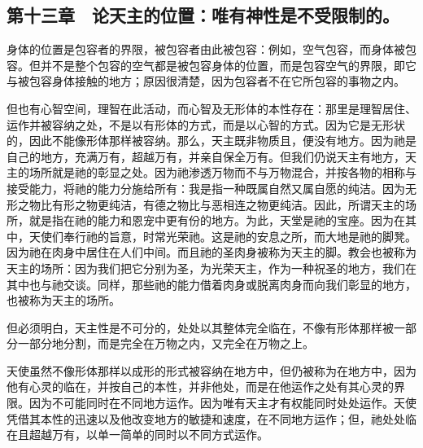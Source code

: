 
\subsection{第十三章　论天主的位置：唯有神性是不受限制的。}

身体的位置是包容者的界限，被包容者由此被包容：例如，空气包容，而身体被包容。但并不是整个包容的空气都是被包容身体的位置，而是包容空气的界限，即它与被包容身体接触的地方；原因很清楚，因为包容者不在它所包容的事物之内。\par

但也有心智空间，理智在此活动，而心智及无形体的本性存在：那里是理智居住、运作并被容纳之处，不是以有形体的方式，而是以心智的方式。因为它是无形状的，因此不能像形体那样被容纳。那么，天主既非物质且，便没有地方。因为祂是自己的地方，充满万有，超越万有，并亲自保全万有。但我们仍说天主有地方，天主的场所就是祂的彰显之处。因为祂渗透万物而不与万物混合，并按各物的相称与接受能力，将祂的能力分施给所有：我是指一种既属自然又属自愿的纯洁。因为无形之物比有形之物更纯洁，有德之物比与恶相连之物更纯洁。因此，所谓天主的场所，就是指在祂的能力和恩宠中更有份的地方。为此，天堂是祂的宝座。因为在其中，天使们奉行祂的旨意，时常光荣祂。这是祂的安息之所，而大地是祂的脚凳。因为祂在肉身中居住在人们中间。而且祂的圣肉身被称为天主的脚。教会也被称为天主的场所：因为我们把它分别为圣，为光荣天主，作为一种祝圣的地方，我们在其中也与祂交谈。同样，那些祂的能力借着肉身或脱离肉身而向我们彰显的地方，也被称为天主的场所。\par

但必须明白，天主性是不可分的，处处以其整体完全临在，不像有形体那样被一部分一部分地分割，而是完全在万物之内，又完全在万物之上。\par

\par

天使虽然不像形体那样以成形的形式被容纳在地方中，但仍被称为在地方中，因为他有心灵的临在，并按自己的本性，并非他处，而是在他运作之处有其心灵的界限。因为不可能同时在不同地方运作。因为唯有天主才有权能同时处处运作。天使凭借其本性的迅速以及他改变地方的敏捷和速度，在不同地方运作；但，祂处处临在且超越万有，以单一简单的同时以不同方式运作。\par

